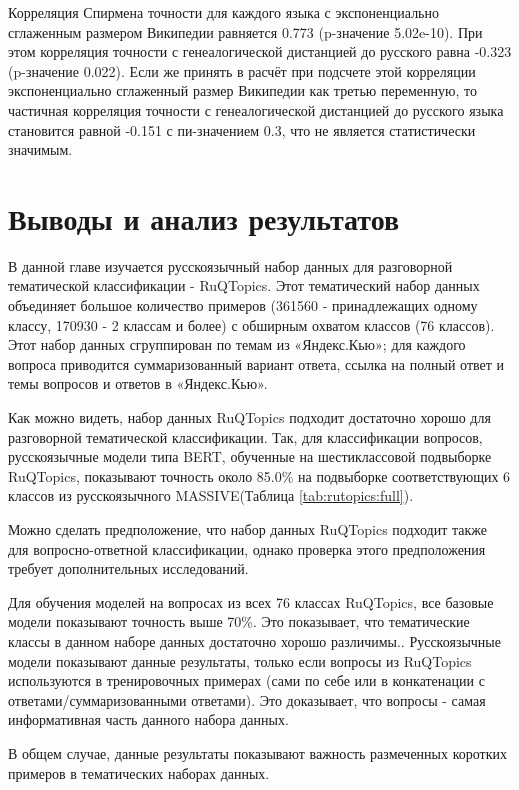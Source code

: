Корреляция Спирмена точности для каждого языка с экспоненциально сглаженным размером Википедии равняется 0.773 (p-значение 5.02e-10). При этом корреляция точности с генеалогической дистанцией до русского равна -0.323 (p-значение 0.022). Если же принять в расчёт при подсчете этой корреляции экспоненциально сглаженный размер Википедии как третью переменную, то частичная корреляция точности с генеалогической дистанцией до русского языка становится равной -0.151 с пи-значением 0.3, что не является статистически значимым.


\section{Выводы и анализ результатов} 

В данной главе изучается русскоязычный набор данных для разговорной тематической классификации - {RuQTopics}. Этот тематический набор данных объединяет большое количество примеров (361560 - принадлежащих одному классу, 170930 - 2 классам и более) с обширным охватом классов (76 классов). Этот набор данных сгруппирован по темам из «Яндекс.Кью»; для каждого вопроса приводится суммаризованный вариант ответа, ссылка на полный ответ и темы вопросов и ответов в «Яндекс.Кью».

Как можно видеть, набор данных {RuQTopics} подходит достаточно хорошо для разговорной тематической классификации. Так, для классификации вопросов, русскоязычные модели типа BERT, обученные на шестиклассовой подвыборке {RuQTopics}, показывают точность около 85.0\% на подвыборке соответствующих 6 классов из русскоязычного {MASSIVE}(Таблица \ref{tab:rutopics:full}).

Можно сделать предположение, что набор данных {RuQTopics} подходит также для вопросно-ответной классификации, однако проверка этого предположения требует дополнительных исследований.

Для обучения моделей на вопросах из всех 76 классах {RuQTopics}, все базовые модели показывают точность выше 70\%. Это показывает, что тематические классы в данном наборе данных достаточно хорошо различимы..
Русскоязычные модели показывают данные результаты, только если вопросы из  {RuQTopics} используются в тренировочных примерах (сами по себе или в конкатенации с ответами/суммаризованными ответами). Это доказывает, что вопросы - самая информативная часть данного набора данных.

В общем случае, данные результаты показывают важность размеченных коротких примеров в тематических наборах данных. 

